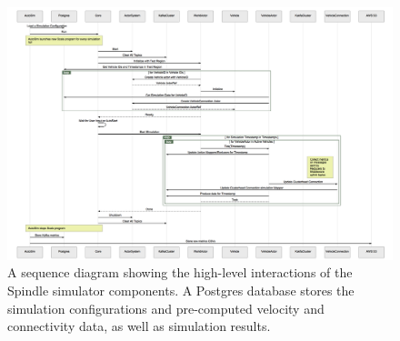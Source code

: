 \documentclass{thesis}
\begin{document}
    \begin{figure}
        \centering
        \includegraphics[width=\textheight]{binImages/simulator-sequence.png}
        \caption{A sequence diagram showing the high-level interactions of
        the Spindle simulator components. A Postgres database stores the
        simulation configurations and pre-computed velocity and connectivity
        data, as well as simulation results.}
        \label{sim:sequence}
    \end{figure}
\end{document}
